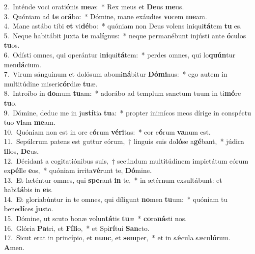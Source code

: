 {2.~}Inténde voci orati\textbf{ó}nis \textbf{me}æ:~* Rex meus et \textbf{De}us \textbf{me}us.\\
{3.~}Quóniam ad \textbf{te} o\textbf{rá}bo:~* Dómine, mane exáudies \textbf{vo}cem \textbf{me}am.\\
{4.~}Mane astábo tibi \textbf{et} vi\textbf{dé}bo:~* quóniam non Deus volens iniqui\textbf{tá}tem \textbf{tu} es.\\
{5.~}Neque habitábit juxta \textbf{te} ma\textbf{lí}gnus:~* neque permanébunt injústi ante \textbf{ó}culos \textbf{tu}os.\\
{6.~}Odísti omnes, qui operántur i\textbf{ni}qui\textbf{tá}tem:~* perdes omnes, qui lo\textbf{quún}tur men\textbf{dá}cium.\\
{7.~}Virum sánguinum et dolósum abomi\textbf{ná}bitur \textbf{Dó}\textbf{mi}nus:~* ego autem in multitúdine miseri\textbf{cór}diæ \textbf{tu}æ.\\
{8.~}Introíbo in \textbf{do}mum \textbf{tu}am:~* adorábo ad templum sanctum tuum in ti\textbf{mó}re \textbf{tu}o.\\
{9.~}Dómine, deduc me in ju\textbf{stí}tia \textbf{tu}a:~* propter inimícos meos dírige in conspéctu tuo \textbf{vi}am \textbf{me}am.\\
{10.~}Quóniam non est in ore e\textbf{ó}rum \textbf{vé}\textbf{ri}tas:~* cor e\textbf{ó}rum \textbf{va}num est.\\
{11.~}Sepúlcrum patens est guttur eórum,~† linguis suis do\textbf{ló}se a\textbf{gé}bant,~* júdica \textbf{il}los, \textbf{De}us.\\
{12.~}Décidant a cogitatiónibus suis,~† secúndum multitúdinem impietátum eórum ex\textbf{pél}le \textbf{e}os,~* quóniam irrita\textbf{vé}runt te, \textbf{Dó}mine.\\
{13.~}Et læténtur omnes, qui \textbf{spe}rant \textbf{in} te,~* in ætérnum exsultábunt: et habi\textbf{tá}bis in \textbf{e}is.\\
{14.~}Et gloriabúntur in te omnes, qui díligunt \textbf{no}men \textbf{tu}um:~* quóniam tu bene\textbf{dí}ces \textbf{ju}sto.\\
{15.~}Dómine, ut scuto bonæ volun\textbf{tá}tis \textbf{tu}æ~* \textbf{co}ro\textbf{ná}sti nos.\\
{16.~}Glória \textbf{Pa}tri, et \textbf{Fí}\textbf{li}o,~* et Spi\textbf{rí}tui \textbf{San}cto.\\
{17.~}Sicut erat in princípio, et \textbf{nunc}, et \textbf{sem}per,~* et in sǽcula sæcu\textbf{ló}rum. \textbf{A}men.\\
